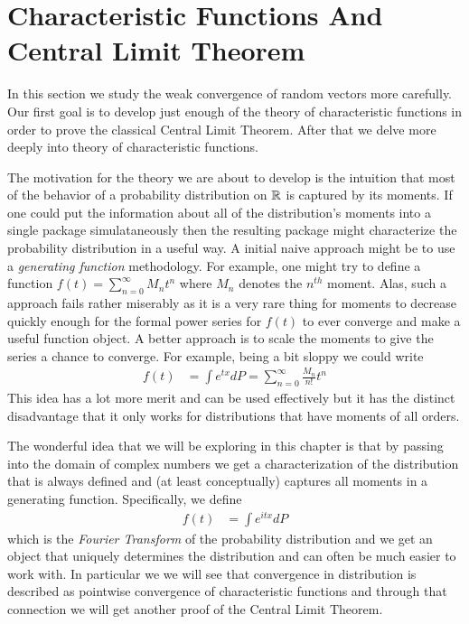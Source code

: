 \chapter{Characteristic Functions And Central Limit Theorem}
In this section we study the weak convergence of random vectors more carefully.
Our first goal is to develop just enough of the theory of
characteristic functions in order to prove the classical Central Limit Theorem.
After that we delve more deeply into theory of characteristic
functions.  

The motivation for the theory we are about to develop is the intuition
that most of the behavior of a probability distribution on $\mathbb{R}$ is
captured by its moments.  If one could put the information about all
of the distribution's moments into a single package simulataneously
then the resulting package might characterize the probability
distribution in a useful way.  A initial naive approach might be to
use a \emph{generating function} methodology.  For example, one might
try to define a function $f(t) = \sum_{n=0}^\infty M_n t^n$ where
$M_n$ denotes the $n^{th}$ moment.  Alas, such a approach fails rather
miserably as it is a very rare thing for moments to decrease quickly
enough for the formal power series for $f(t)$ to ever converge and make a useful
function object.  A better approach is to scale the moments to give
the series a chance to converge.  For example, being a bit sloppy we
could write
\begin{align*}
f(t) &= \int e^{tx} dP = \sum_{n=0}^\infty \frac{M_n}{n!} t^n
\end{align*}
This idea has a lot more merit and can be used effectively but it has
the distinct disadvantage that it only works for distributions that
have moments of all orders.

The wonderful idea that we will be exploring in this chapter is that
by passing into the domain of complex numbers we get a
characterization of the distribution that is always defined and (at
least conceptually) captures all moments in a generating function.
Specifically, we define 
\begin{align*}
f(t) &= \int e^{itx} dP 
\end{align*}
which is the \emph{Fourier Transform} of the probability distribution
and we get an object that uniquely determines the distribution and can
often be much easier to work with.  In particular we we will see that
convergence in distribution is described as pointwise convergence of
characteristic functions and through that connection we will get
another proof of the Central Limit Theorem.

